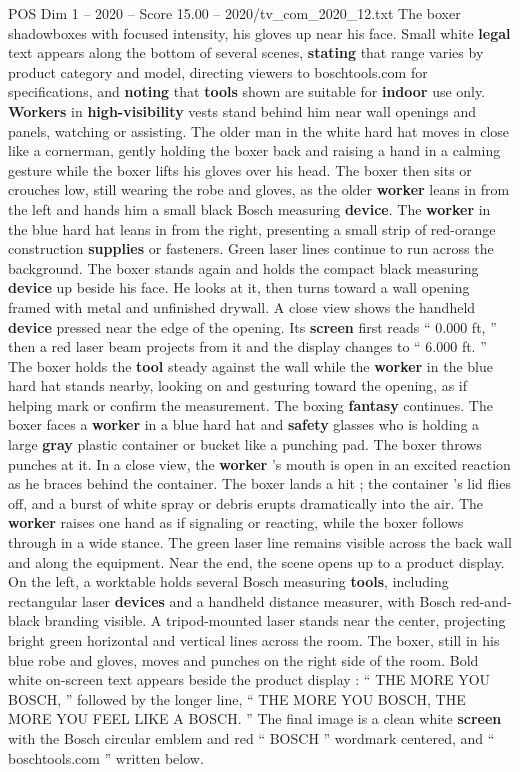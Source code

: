 \begin{textsample}{POS Dim 1 – 2020 – Score 15.00 – 2020/tv\_com\_2020\_12.txt}
The boxer shadowboxes with focused intensity, his gloves up near his face.
Small white \textbf{legal} text appears along the bottom of several scenes, \textbf{stating} that range varies by product category and model, directing viewers to boschtools.com for specifications, and \textbf{noting} that \textbf{tools} shown are suitable for \textbf{indoor} use only. \textbf{Workers} in \textbf{high-visibility} vests stand behind him near wall openings and panels, watching or assisting.
The older man in the white hard hat moves in close like a cornerman, gently holding the boxer back and raising a hand in a calming gesture while the boxer lifts his gloves over his head.
The boxer then sits or crouches low, still wearing the robe and gloves, as the older \textbf{worker} leans in from the left and hands him a small black Bosch measuring \textbf{device}.
The \textbf{worker} in the blue hard hat leans in from the right, presenting a small strip of red-orange construction \textbf{supplies} or fasteners.
Green laser lines continue to run across the background.
The boxer stands again and holds the compact black measuring \textbf{device} up beside his face.
He looks at it, then turns toward a wall opening framed with metal and unfinished drywall.
A close view shows the handheld \textbf{device} pressed near the edge of the opening.
Its \textbf{screen} first reads “ 0.000 ft, ” then a red laser beam projects from it and the display changes to “ 6.000 ft. ” The boxer holds the \textbf{tool} steady against the wall while the \textbf{worker} in the blue hard hat stands nearby, looking on and gesturing toward the opening, as if helping mark or confirm the measurement.
The boxing \textbf{fantasy} continues.
The boxer faces a \textbf{worker} in a blue hard hat and \textbf{safety} glasses who is holding a large \textbf{gray} plastic container or bucket like a punching pad.
The boxer throws punches at it.
In a close view, the \textbf{worker} ’s mouth is open in an excited reaction as he braces behind the container.
The boxer lands a hit ; the container ’s lid flies off, and a burst of white spray or debris erupts dramatically into the air.
The \textbf{worker} raises one hand as if signaling or reacting, while the boxer follows through in a wide stance.
The green laser line remains visible across the back wall and along the equipment.
Near the end, the scene opens up to a product display.
On the left, a worktable holds several Bosch measuring \textbf{tools}, including rectangular laser \textbf{devices} and a handheld distance measurer, with Bosch red-and-black branding visible.
A tripod-mounted laser stands near the center, projecting bright green horizontal and vertical lines across the room.
The boxer, still in his blue robe and gloves, moves and punches on the right side of the room.
Bold white on-screen text appears beside the product display : “ THE MORE YOU BOSCH, ” followed by the longer line, “ THE MORE YOU BOSCH, THE MORE YOU FEEL LIKE A BOSCH. ” The final image is a clean white \textbf{screen} with the Bosch circular emblem and red “ BOSCH ” wordmark centered, and “ boschtools.com ” written below.

\end{textsample}
